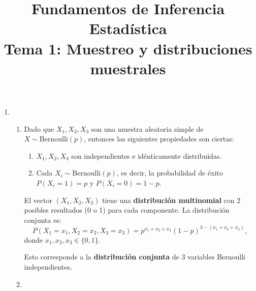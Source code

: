 
\title{Fundamentos de Inferencia Estadística\\Tema 1: Muestreo y distribuciones muestrales}


\maketitle
\begin{enumerate}[label=\color{red}\textbf{\arabic*)}]
    \item {}
        \begin{enumerate}[label=\color{red}\textbf{\alph*)}]
            \item {}

                Dado que $X_1,X_2,X_3$ son una muestra aleatoria simple de $X\sim \mathrm{Bernoulli}(p)$, entonces las siguientes propiedades son ciertas:
                \begin{enumerate}[label=\arabic*)]
                    \item $X_1,X_2,X_3$ son independientes e idénticamente distribuidas.
                    \item Cada $X_i\sim \mathrm{Bernoulli}(p)$, es decir, la probabilidad de éxito $P(X_i=1)=p$ y  $P(X_i=0)=1-p$.
                \end{enumerate}
                El vector $(X_1,X_2,X_3)$ tiene una \textbf{distribución multinomial} con 2 posibles resultados (0 o 1) para cada componente. La distribución conjunta es: \[
                P(X_1=x_1,X_2=x_2,X_3=x_3)=p^{x_1+x_2+x_3}(1-p)^{3-(x_1+x_2+x_3)},
                \]donde $x_1,x_2,x_3\in \{0,1\} $.

                Esto corresponde a la \textbf{distribución conjunta} de 3 variables Bernoulli independientes. 
            \item {} 


\end{enumerate}
\end{enumerate}
